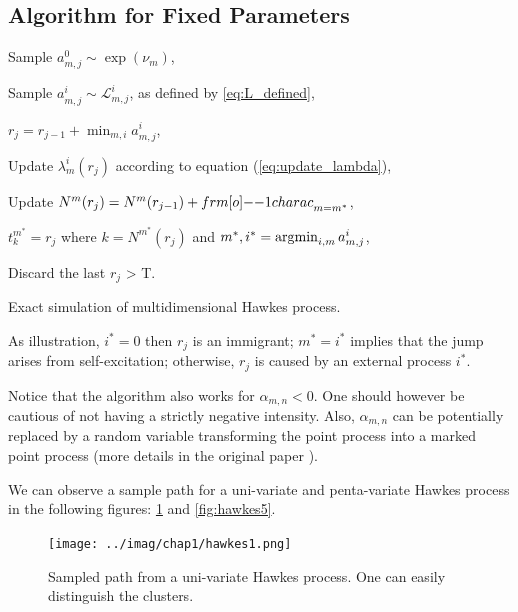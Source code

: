 \documentclass[11pt]{book}
\begin{document}
\subsection{Algorithm for Fixed Parameters}



\begin{algorithm}[H]
\label{algo:simul_hp}
\SetAlgoLined

			{ 
					{
						{Sample $a_{m,j}^0 \sim \exp( \nu_m ) $,
						
							{Sample $a_{m,j}^i \sim  \mathcal L^i_{m,j} $, as defined by \ref{eq:L_defined},
							}
						}
						
						$r_j = r_{j-1} + \min_{m,i} a_{m,j}^i$,
						
							{Update $\lambda_m^i ( r_j )$ according to equation (\ref{eq:update_lambda}),
							
							Update $N^m ( r_j ) = N^m( r_{j-1} ) + {\11charac}_{m = m^*} $,}
					$t_k^{m^*} = r_j$ where $k = N^{m^*} ( r_j ) $ and $ m^*,i^* = \operatorname*{\arg\!\min}_{i,m} a_{m,j}^i $,
					}
			Discard the last $r_j$ > T.
			}
\caption{Exact simulation of multidimensional Hawkes process.}
\end{algorithm}



\begin{remarque}
As illustration, $i^* = 0$ then $r_j$ is an immigrant; $m^* = i^*$ implies that the jump arises from self-excitation; otherwise, $r_j$ is caused by an external process $i^*$.
\end{remarque}

\begin{remarque}
Notice that the algorithm also works for $\alpha_{m,n} < 0$. One should however be cautious of not having a strictly negative intensity. Also, $\alpha_{m,n}$ can be potentially replaced by a random variable transforming the point process into a marked point process (more details in the original paper \cite{my_algo_simul}).
\end{remarque}

We can observe a sample path for a uni-variate and penta-variate Hawkes process in the following figures: \ref{fig:hawkes1} and \ref{fig:hawkes5}.

\begin{figure}
\centering
\texttt{[image: ../imag/chap1/hawkes1.png]}
\caption{Sampled path from a uni-variate Hawkes process. One can easily distinguish the clusters.}
\label{fig:hawkes1}
\end{figure}
\end{document}

